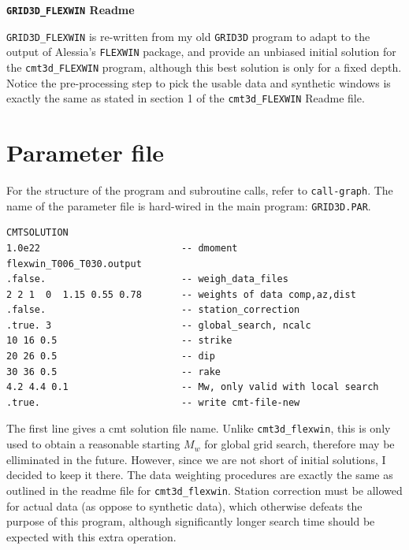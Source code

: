 \documentclass[12pt,titlepage,fleqn]{article}
\begin{document}
\begin{spacing}{1.0} %
\begin{center}

\Large {\vspace{0.1in} \bf \verb=GRID3D_FLEXWIN= Readme}
\end{center}

\end{spacing}

\verb=GRID3D_FLEXWIN= is re-written from my old \verb=GRID3D= program to adapt to the output of Alessia's \verb=FLEXWIN= package, and provide an unbiased initial solution for the \verb=cmt3d_FLEXWIN= program, although this best solution is only for a fixed depth. Notice the pre-processing step to pick the usable data and synthetic windows is exactly the same as stated in section 1 of the \verb=cmt3d_FLEXWIN= Readme file. 

\section{Parameter file}

For the structure of the program and subroutine calls, refer to \verb=call-graph=. The name of the parameter file is hard-wired in the main program: \verb=GRID3D.PAR=.

\begin{verbatim}
CMTSOLUTION
1.0e22                         -- dmoment
flexwin_T006_T030.output
.false.                        -- weigh_data_files
2 2 1  0  1.15 0.55 0.78       -- weights of data comp,az,dist
.false.                        -- station_correction
.true. 3                       -- global_search, ncalc
10 16 0.5                      -- strike
20 26 0.5                      -- dip
30 36 0.5                      -- rake
4.2 4.4 0.1                    -- Mw, only valid with local search
.true.                         -- write cmt-file-new
\end{verbatim}

The first line gives a cmt solution file name. Unlike \verb=cmt3d_flexwin=, this is only used to obtain a reasonable starting $M_w$ for global grid search, therefore may be elliminated in the future. However, since we are not short of initial solutions, I decided to keep it there. The data weighting procedures are exactly the same as outlined in the readme file for \verb=cmt3d_flexwin=. Station correction must be allowed for actual data (as oppose to synthetic data), which otherwise defeats the purpose of this program, although significantly longer search time should be expected with this extra operation.
\end{document}

